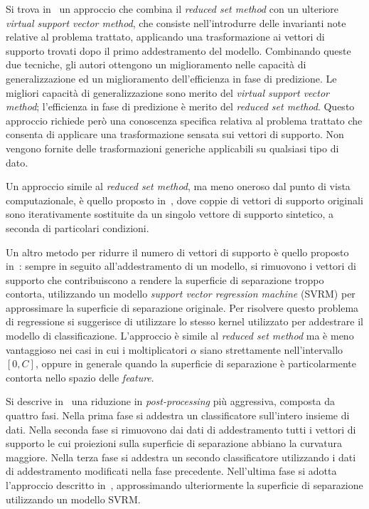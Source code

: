 Si trova in~\cite{burges_improving_accuracy} un approccio che combina il \emph{reduced set method} con un ulteriore \emph{virtual support vector method}, che consiste nell'introdurre delle invarianti note relative al problema trattato, applicando una trasformazione ai vettori di supporto trovati dopo il primo addestramento del modello. 
Combinando queste due tecniche, gli autori ottengono un miglioramento nelle capacità di generalizzazione ed un miglioramento dell'efficienza in fase di predizione. Le migliori capacità di generalizzazione sono merito del \emph{virtual support vector method}; l'efficienza in fase di predizione è merito del \emph{reduced set method}.
Questo approccio richiede però una conoscenza specifica relativa al problema trattato che consenta di applicare una trasformazione sensata sui vettori di supporto. Non vengono fornite delle trasformazioni generiche applicabili su qualsiasi tipo di dato. 

Un approccio simile al \emph{reduced set method}, ma meno oneroso dal punto di vista computazionale, è quello proposto in~\cite{2005_merging_strategy}, dove coppie di vettori di supporto originali sono iterativamente sostituite da un singolo vettore di supporto sintetico, a seconda di particolari condizioni. 

Un altro metodo per ridurre il numero di vettori di supporto è quello proposto in~\cite{1998_reducing_svm_complexity}:
sempre in seguito all'addestramento di un modello, si rimuovono i vettori di supporto che contribuiscono a rendere la superficie di separazione troppo contorta, utilizzando un modello \emph{support vector regression machine} (SVRM) per approssimare la superficie di separazione originale.
Per risolvere questo problema di regressione si suggerisce di utilizzare lo stesso kernel utilizzato per addestrare il modello di classificazione.
L'approccio è simile al \emph{reduced set method} ma è meno vantaggioso nei casi in cui i moltiplicatori $\alpha$ siano strettamente nell'intervallo $[0,C]$, oppure in generale quando la superficie di separazione è particolarmente contorta nello spazio delle \emph{feature}.

Si descrive in~\cite{2005_multistage_postprocessing} una riduzione in \emph{post-processing} più aggressiva, composta da quattro fasi. 
Nella prima fase si addestra un classificatore sull'intero insieme di dati. 
Nella seconda fase si rimuovono dai dati di addestramento tutti i vettori di supporto le cui proiezioni sulla superficie di separazione abbiano la curvatura maggiore. 
Nella terza fase si addestra un secondo classificatore utilizzando i dati di addestramento modificati nella fase precedente. 
Nell'ultima fase si adotta l'approccio descritto in~\cite{1998_reducing_svm_complexity}, approssimando ulteriormente la superficie di separazione utilizzando un modello SVRM.

